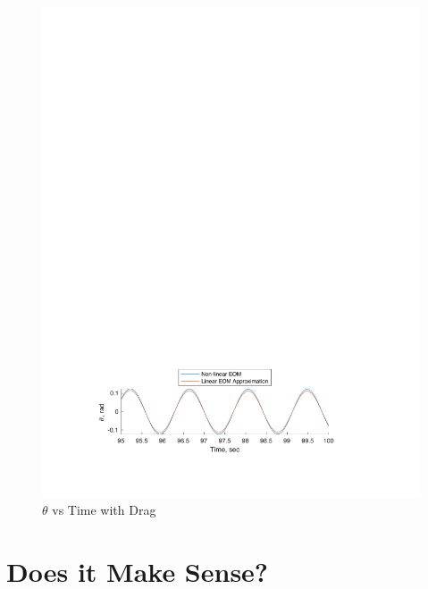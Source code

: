 \documentclass[12pt]{report}
\begin{document}
\begin{flushleft}
\begin{figure}[ht]
  \includegraphics[center]{compareclose}
  \caption{$\theta$ vs Time with Drag}
\end{figure}
\newpage
\section{Does it Make Sense?}

\end{flushleft}
\end{document}
